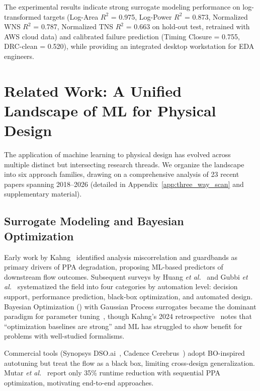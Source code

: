 \documentclass[10pt,conference]{IEEEtran}
\newcommand{\Rtwo}{$R^2$}
\newcommand{\etal}{\textit{et al.}}
\newcommand{\BO}{\text{BO}}
\newcommand{\AUC}{\text{AUC}}
\begin{document}
The experimental results indicate strong surrogate modeling performance on log-transformed targets (Log-Area \Rtwo{} = 0.975, Log-Power \Rtwo{} = 0.873, Normalized WNS \Rtwo{} = 0.787, Normalized TNS \Rtwo{} = 0.663 on hold-out test, retrained with AWS cloud data) and calibrated failure prediction (Timing Closure \AUC{} = 0.755, DRC-clean \AUC{} = 0.520), while providing an integrated desktop workstation for EDA engineers.


\section{Related Work: A Unified Landscape of ML for Physical Design}
\label{sec:related_work}

The application of machine learning to physical design has evolved across multiple distinct but intersecting research threads. We organize the landscape into six approach families, drawing on a comprehensive analysis of 23 recent papers spanning 2018--2026 (detailed in Appendix~\ref{app:three_way_scan} and supplementary material).

\subsection{Surrogate Modeling and Bayesian Optimization}
\label{sec:surrogate_bo}

Early work by Kahng~\cite{kahng2018machine} identified analysis miscorrelation and guardbands as primary drivers of PPA degradation, proposing ML-based predictors of downstream flow outcomes. Subsequent surveys by Huang \etal~\cite{huang2021machine} and Gubbi \etal~\cite{gubbi2022survey} systematized the field into four categories by automation level: decision support, performance prediction, black-box optimization, and automated design. Bayesian Optimization (\BO{}) with Gaussian Process surrogates became the dominant paradigm for parameter tuning~\cite{mutar2026auto, kahng2024solvers}, though Kahng's 2024 retrospective~\cite{kahng2024solvers} notes that ``optimization baselines are strong'' and ML has struggled to show benefit for problems with well-studied formalisms.

Commercial tools (Synopsys DSO.ai~\cite{verma2024dso}, Cadence Cerebrus~\cite{agnesina2020vlsi}) adopt BO-inspired autotuning but treat the flow as a black box, limiting cross-design generalization. Mutar \etal~\cite{mutar2026auto} report only 35\% runtime reduction with sequential PPA optimization, motivating end-to-end approaches.
\end{document}
